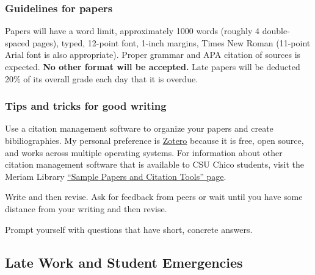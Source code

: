 \documentclass[11pt,]{article}
\begin{document}
\hypertarget{guidelines-for-papers}{%
\subsubsection{Guidelines for papers}\label{guidelines-for-papers}}

Papers will have a word limit, approximately 1000 words (roughly 4
double-spaced pages), typed, 12-point font, 1-inch margins, Times New
Roman (11-point Arial font is also appropriate). Proper grammar and APA
citation of sources is expected. \textbf{No other format will be
accepted.} Late papers will be deducted 20\% of its overall grade each
day that it is overdue.

\hypertarget{tips-and-tricks-for-good-writing}{%
\subsubsection{Tips and tricks for good
writing}\label{tips-and-tricks-for-good-writing}}

Use a citation management software to organize your papers and create
bibiliographies. My personal preference is
\href{https://www.zotero.org/}{Zotero} because it is free, open source,
and works across multiple operating systems. For information about other
citation management software that is available to CSU Chico students,
visit the Meriam Library
\href{https://libguides.csuchico.edu/c.php?g=432300\&p=2948649}{``Sample
Papers and Citation Tools'' page}.

Write and then revise. Ask for feedback from peers or wait until you
have some distance from your writing and then revise.

Prompt yourself with questions that have short, concrete answers.

\hypertarget{late-work-and-student-emergencies}{%
\subsection{Late Work and Student
Emergencies}\label{late-work-and-student-emergencies}}
\end{document}
